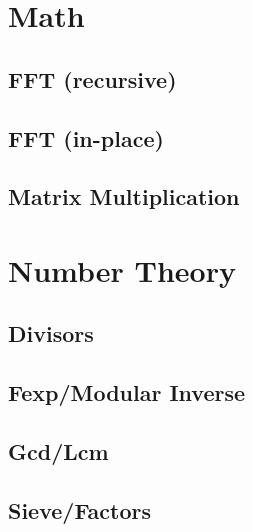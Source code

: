 \section{Math}
\subsection{FFT (recursive)}
\raggedbottom
\vspace{-.7\baselineskip}\hrulefill
\vspace{0.1\baselineskip}\subsection{FFT (in-place)}
\raggedbottom
\vspace{-.7\baselineskip}\hrulefill
\vspace{0.1\baselineskip}\subsection{Matrix Multiplication}
\raggedbottom
\vspace{-.7\baselineskip}\hrulefill
\vspace{0.1\baselineskip}
\section{Number Theory}
\subsection{Divisors}
\raggedbottom
\vspace{-.7\baselineskip}\hrulefill
\vspace{0.1\baselineskip}\subsection{Fexp/Modular Inverse}
\raggedbottom
\vspace{-.7\baselineskip}\hrulefill
\vspace{0.1\baselineskip}\subsection{Gcd/Lcm}
\raggedbottom
\vspace{-.7\baselineskip}\hrulefill
\vspace{0.1\baselineskip}\subsection{Sieve/Factors}
\raggedbottom
\vspace{-.7\baselineskip}\hrulefill
\vspace{0.1\baselineskip}
